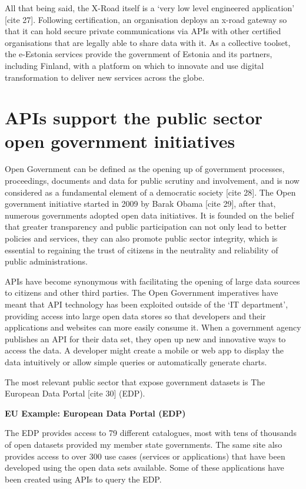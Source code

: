 All that being said, the X-Road itself is a ‘very low level engineered application’
[cite 27]. Following certification, an organisation deploys an x-road gateway
so that it can hold secure private communications via APIs with other certified
organisations that are legally able to share data with it. As a collective toolset,
the e-Estonia services provide the government of Estonia and its partners,
including Finland, with a platform on which to innovate and use digital
transformation to deliver new services across the globe.

\section{APIs support the public sector open government initiatives}

Open Government can be defined as the opening up of government processes,
proceedings, documents and data for public scrutiny and involvement, and is
now considered as a fundamental element of a democratic society [cite 28].
The Open government initiative started in 2009 by Barak Obama [cite 29], after that,
numerous governments adopted open data initiatives. It is founded on the
belief that greater transparency and public participation can not only lead
to better policies and services, they can also promote public sector
integrity, which is essential to regaining the trust of citizens in the
neutrality and reliability of public administrations.

APIs have become synonymous with facilitating the opening of large data sources
to citizens and other third parties. The Open Government imperatives have meant
that API technology has been exploited outside of the ‘IT department’,
providing access into large open data stores so that developers and their
applications and websites can more easily consume it. When a government agency
publishes an API for their data set, they open up new and innovative ways to
access the data. A developer might create a mobile or web app to display the
data intuitively or allow simple queries or automatically generate charts.

The most relevant public sector that expose government datasets is The European
Data Portal [cite 30] (EDP).

\textbf{EU Example: European Data Portal (EDP)}

The EDP provides access to 79 different catalogues, most with tens of thousands of
open datasets provided my member state governments. The same site also provides
access to over 300 use cases (services or applications) that have been developed
using the open data sets available. Some of these applications have been created
using APIs to query the EDP.

